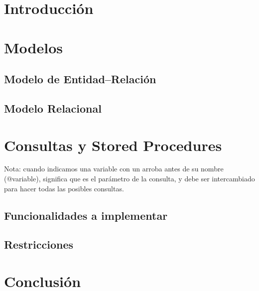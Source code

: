 \documentclass[hidelinks,a4paper,11pt, nofootinbib]{article}
\begin{document}
\maketitle

\tableofcontents
\newpage

\section{Introducción}

\newpage

\section{Modelos}
\subsection{Modelo de Entidad--Relación}

\newpage

\subsection{Modelo Relacional}

\newpage

\section{Consultas y Stored Procedures}
Nota: cuando indicamos una variable con un arroba antes de su nombre (@variable), significa que es el parámetro de la consulta, y debe ser intercambiado para hacer todas las posibles consultas.

\subsection{Funcionalidades a implementar}

\subsection{Restricciones}

\newpage


\section{Conclusión}

\newpage


%
%
\end{document}
